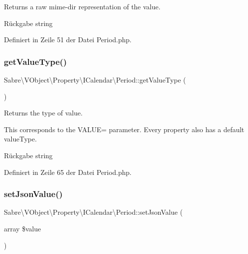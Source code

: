 Returns a raw mime-\/dir representation of the value.

\begin{DoxyReturn}{Rückgabe}
string 
\end{DoxyReturn}


Definiert in Zeile 51 der Datei Period.\+php.

\mbox{\label{class_sabre_1_1_v_object_1_1_property_1_1_i_calendar_1_1_period_afad01e4b39cffc396a26aa9cd8c1fd71}} 
\subsubsection{\texorpdfstring{get\+Value\+Type()}{getValueType()}}
{\footnotesize\ttfamily Sabre\textbackslash{}\+V\+Object\textbackslash{}\+Property\textbackslash{}\+I\+Calendar\textbackslash{}\+Period\+::get\+Value\+Type (\begin{DoxyParamCaption}{ }\end{DoxyParamCaption})}

Returns the type of value.

This corresponds to the V\+A\+L\+UE= parameter. Every property also has a \textquotesingle{}default\textquotesingle{} value\+Type.

\begin{DoxyReturn}{Rückgabe}
string 
\end{DoxyReturn}


Definiert in Zeile 65 der Datei Period.\+php.

\mbox{\label{class_sabre_1_1_v_object_1_1_property_1_1_i_calendar_1_1_period_afb29a58b5ee13f84d57db0702dfade8e}} 
\subsubsection{\texorpdfstring{set\+Json\+Value()}{setJsonValue()}}
{\footnotesize\ttfamily Sabre\textbackslash{}\+V\+Object\textbackslash{}\+Property\textbackslash{}\+I\+Calendar\textbackslash{}\+Period\+::set\+Json\+Value (\begin{DoxyParamCaption}\item[{array}]{\$value }\end{DoxyParamCaption})}

